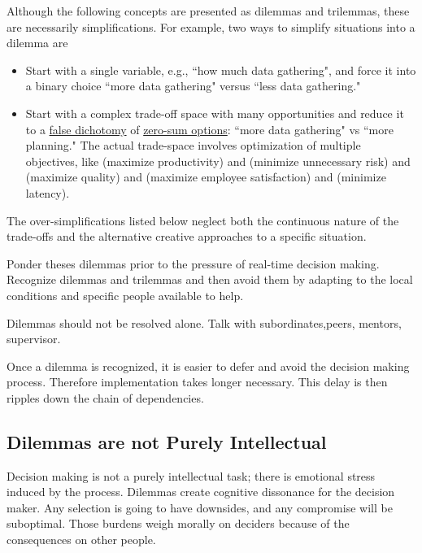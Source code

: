 Although the following concepts are presented as dilemmas and trilemmas, these are necessarily simplifications. For example, two ways to simplify situations into a dilemma are
\begin{itemize}
    \item Start with a single variable, e.g., ``how much data gathering", and force it into a binary choice ``more data gathering" versus ``less data gathering."
    
    \item Start with a complex trade-off space with many opportunities and reduce it to a \href{https://en.wikipedia.org/wiki/False_dilemma}{false dichotomy} of \href{https://en.wikipedia.org/wiki/Zero-sum_thinking}{zero-sum options}: ``more data gathering" vs ``more planning." The actual trade-space involves optimization of multiple objectives, like (maximize productivity) and (minimize unnecessary risk) and (maximize quality) and (maximize employee satisfaction) and (minimize latency). 
\end{itemize}
The over-simplifications listed below neglect both the continuous nature of the trade-offs and the alternative creative approaches to a specific situation. 




Ponder theses dilemmas prior to the pressure of real-time decision making.  Recognize dilemmas and trilemmas and then avoid them by adapting to the local conditions and specific people available to help.


Dilemmas should not be resolved alone. Talk with subordinates,peers, mentors, supervisor.


Once a dilemma is recognized, it is easier to defer and avoid the  decision making process. Therefore implementation takes longer necessary. 
This delay is then ripples down the chain of dependencies. 

\subsection*{Dilemmas are not Purely Intellectual}
Decision making is not a purely intellectual task; there is emotional stress induced by the process. Dilemmas create cognitive dissonance for the decision maker. Any selection is going to have downsides, and any compromise will be suboptimal. Those burdens weigh morally on deciders because of the consequences on other people.

